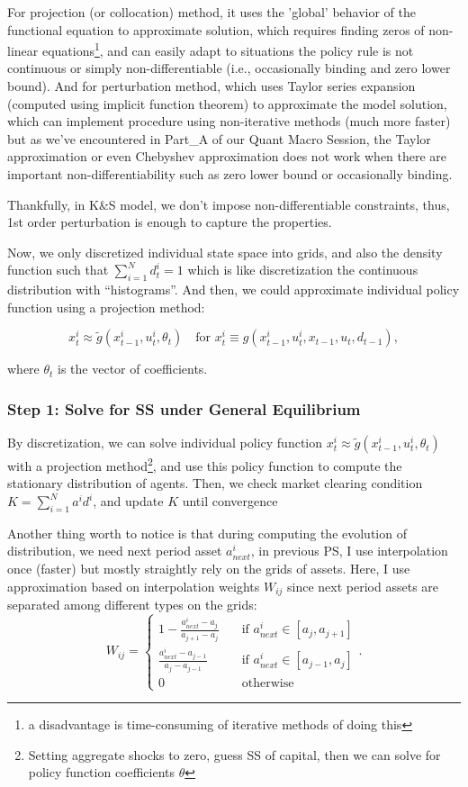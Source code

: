 For projection (or collocation) method, it uses the 'global' behavior of the functional equation to approximate solution, which requires finding zeros of non-linear equations\footnote{a disadvantage is time-consuming of iterative methods of doing this}, and can easily adapt to situations the policy rule is not continuous or simply non-differentiable (i.e., occasionally binding and zero lower bound). And for perturbation method, which uses Taylor series expansion (computed using implicit function theorem) to approximate the model solution, which can implement procedure using non-iterative methods (much more faster) but as we've encountered in Part\_A of our Quant Macro Session, the Taylor approximation or even Chebyshev approximation does not work when there are important non-differentiability such as zero lower bound or occasionally binding. 

Thankfully, in K\&S model, we don't impose non-differentiable constraints, thus, 1st order perturbation is enough to capture the properties.  

Now, we only {\color{red} discretized individual state space into grids}, and also the density function such that $\sum_{i=1}^{N} d^i_t = 1$ which is like discretization the continuous distribution with ``histograms''. And then, we could approximate individual policy function using a projection method:

\[ 
x^i_t \approx \tilde{g}(x^i_{t-1},u^i_t, \theta_t) \quad \text{for } x^i_t \equiv g(x^i_{t-1}, u^i_t, x_{t-1},u_t,d_{t-1}), 
\]

where $\theta_t$ is the vector of coefficients. 

\subsubsection*{Step 1: Solve for SS under General Equilibrium}

By discretization, we can solve individual policy function $x^i_t \approx \tilde{g}(x^i_{t-1},u^i_t, \theta_t)$ with a projection method\footnote{Setting aggregate shocks to zero, guess SS of capital, then we can solve for policy function coefficients $\theta$}, and use this policy function to compute the stationary distribution of agents. Then, we check market clearing condition $K=\sum_{i=1}^{N} a^i d^i$, and update $K$ until convergence

Another thing worth to notice is that during computing the evolution of distribution, we need next period asset $a^i_{next}$, in previous PS, I use interpolation once (faster) but mostly straightly rely on the grids of assets. Here, I use approximation based on interpolation weights $W_{ij}$ since next period assets are separated among different types on the grids: 
\[
 W_{ij}=
 \begin{cases}
 1- \frac{a^i_{next} - a_j}{a_{j+1}-a_j} \quad &\text{if } a^i_{next} \in [a_j, a_{j+1}]\\ 
 \frac{a^i_{next} - a_{j-1}}{a_{j}-a_{j-1}} \quad &\text{if } a^i_{next} \in [a_{j-1}, a_{j}] \\
 0  \quad &\text{otherwise } 
 \end{cases}. 
\]

